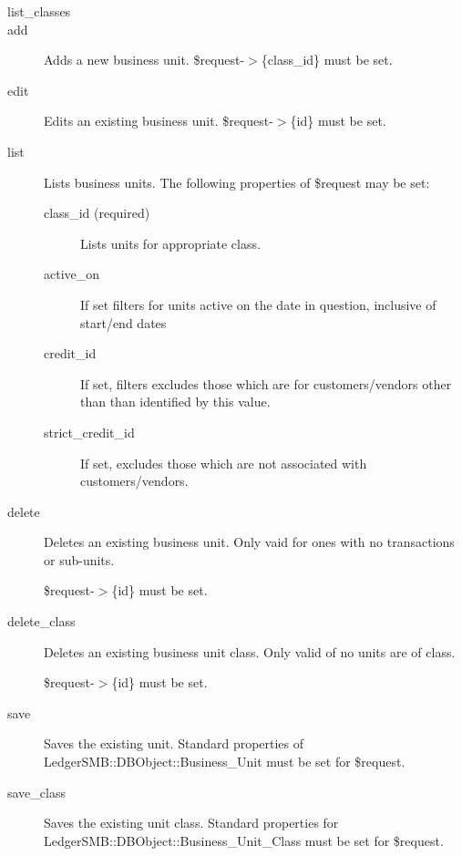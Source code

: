 \begin{description}

\item[{list\_classes}] \mbox{}
\item[{add}] \mbox{}

Adds a new business unit.  \$request-$>$\{class\_id\} must be set.


\item[{edit}] \mbox{}

Edits an existing business unit.  \$request-$>$\{id\} must be set.


\item[{list}] \mbox{}

Lists business units.  The following properties of \$request may be set:

\begin{description}

\item[{class\_id (required)}] \mbox{}

Lists units for appropriate class.


\item[{active\_on}] \mbox{}

If set filters for units active on the date in question, inclusive of start/end
dates


\item[{credit\_id}] \mbox{}

If set, filters excludes those which are for customers/vendors other than than 
identified by this value.


\item[{strict\_credit\_id}] \mbox{}

If set, excludes those which are not associated with customers/vendors.

\end{description}

\item[{delete}] \mbox{}

Deletes an existing business unit.  Only vaid for ones with no transactions or 
sub-units.



\$request-$>$\{id\} must be set.


\item[{delete\_class}] \mbox{}

Deletes an existing business unit class.  Only valid of no units are of class.



\$request-$>$\{id\} must be set.


\item[{save}] \mbox{}

Saves the existing unit.  Standard properties of 
LedgerSMB::DBObject::Business\_Unit must be set for \$request.


\item[{save\_class}] \mbox{}

Saves the existing unit class.  Standard properties for 
LedgerSMB::DBObject::Business\_Unit\_Class must be set for \$request.

\end{description}
